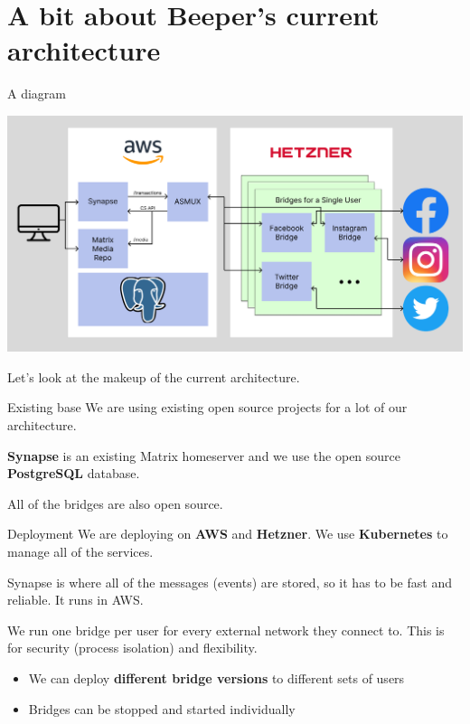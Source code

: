 \documentclass{beeper}
\begin{document}
\section{A bit about Beeper's current architecture}

\begin{frame}{A diagram}
    \centerline{\includegraphics[width=1.15\textwidth]{images/current-architecture}}

    Let's look at the makeup of the current architecture.
\end{frame}

\begin{frame}{Existing base}
    We are using existing open source projects for a lot of our architecture.
    \pause

    \textbf{Synapse} is an existing Matrix homeserver and we use the open source
    \textbf{PostgreSQL} database.

    All of the bridges are also open source.
\end{frame}

\begin{frame}{Deployment}
    We are deploying on \textbf{AWS} and \textbf{Hetzner}. We use
    \textbf{Kubernetes} to manage all of the services.
    \pause

    Synapse is where all of the messages (events) are stored, so it has to be
    fast and reliable. It runs in AWS.
    \pause

    We run one bridge per user for every external network they connect to. This
    is for security (process isolation) and flexibility.
    \begin{itemize}[<+->]
        \item We can deploy \textbf{different bridge versions} to different sets
            of users
        \item Bridges can be stopped and started individually
    \end{itemize}
\end{frame}
\end{document}
